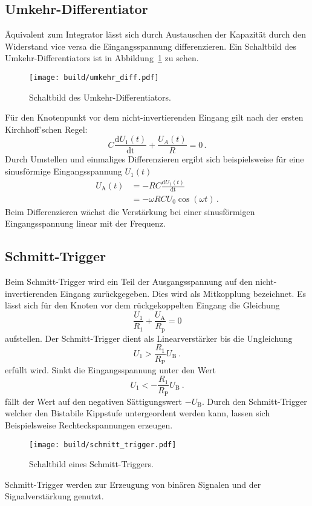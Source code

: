 \subsection*{Umkehr-Differentiator}%
\label{sub:umkehr_differentiator}
Äquivalent zum Integrator lässt sich durch Austauschen der Kapazität durch
den Widerstand vice versa die Eingangsspannung differenzieren.
Ein Schaltbild des Umkehr-Differentiators ist in Abbildung~\ref{fig:diff} zu
sehen.
\begin{figure}[ht]
		\centering
		\texttt{[image: build/umkehr\_diff.pdf]}
		\caption{Schaltbild des Umkehr-Differentiators.\cite{anleitung}}
		\label{fig:diff}
\end{figure}
Für den Knotenpunkt vor dem nicht-invertierenden Eingang gilt nach der ersten
Kirchhoff'schen Regel:
\begin{equation}
		C \frac{\text{d} U_1(t)}{\text{dt}} + \frac{U_A(t)}{R} = 0 \, .
\end{equation}
Durch Umstellen und einmaliges Differenzieren ergibt sich beispielsweise für
eine sinusförmige Eingangsspannung $U_1(t)$
\begin{align}
		U_\text{A}(t) &= - RC \frac{\text{d}U_1(t)}{\text{dt}} \nonumber \\
                  &= - \omega R C U_0 \cos(\omega t) \label{eq:differentiator} \, .
\end{align}
Beim Differenzieren wächst die Verstärkung bei einer sinusförmigen
Eingangsspannung linear mit der Frequenz.

\subsection{Schmitt-Trigger}%
\label{sub:schmitt_trigger1}

Beim Schmitt-Trigger wird ein Teil der Ausgangsspannung auf den
nicht-invertierenden Eingang zurückgegeben.
Dies wird als Mitkopplung bezeichnet.
Es lässt sich für den Knoten vor dem rückgekoppelten Eingang die Gleichung
\begin{equation}
		\frac{U_1}{R_1} + \frac{U_\text{A}}{R_\text{p}} = 0
\end{equation}
aufstellen.
Der Schmitt-Trigger dient als Linearverstärker bis die Ungleichung
\begin{equation}
		\label{eq:schmitt}
		U_1 > \frac{R_1}{R_\text{P}} U_\text{B} \ .
\end{equation}
erfüllt wird.
Sinkt die Eingangsspannung unter den Wert
\begin{equation}
		\label{eq:m_ub}
		U_1 < - \frac{R_1}{R_\text{P}} U_\text{B} \ .
\end{equation}
fällt der Wert auf den negativen Sättigungswert $-U_\text{B}$.
Durch den Schmitt-Trigger welcher den Bistabile Kippstufe untergeordent werden
kann, lassen sich Beispielsweise Rechteckspannungen erzeugen.
\begin{figure}[ht]
		\centering
		\texttt{[image: build/schmitt\_trigger.pdf]}
		\caption{Schaltbild eines Schmitt-Triggers. \cite{anleitung}}
    \label{fig:schmitt_theo}
\end{figure}
Schmitt-Trigger werden zur Erzeugung von binären Signalen und der
Signalverstärkung genutzt.

